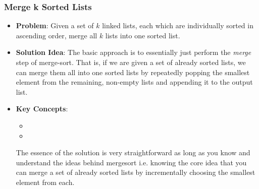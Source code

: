 \documentclass[10pt,a4paper]{article}
\begin{document}
\subsubsection*{Merge k Sorted Lists}

\begin{itemize}
    \item \textbf{Problem}: Given a set of $k$ linked lists, each which are individually sorted in ascending order, merge all $k$ lists into one sorted list. 
    \item \textbf{Solution Idea}: The basic approach is to essentially just perform the \textit{merge} step of merge-sort. That is, if we are given a set of already sorted lists, we can merge them all into one sorted lists by repeatedly popping the smallest element from the remaining, non-empty lists and appending it to the output list.
    \item \textbf{Key Concepts}: 
    \begin{itemize}
        \item {}
        \item {}
    \end{itemize}
    The essence of the solution is very straightforward as long as you know and understand the ideas behind mergesort i.e. knowing the core idea that you can merge a set of already sorted lists by incrementally choosing the smallest element from each.
\end{itemize}
\end{document}
